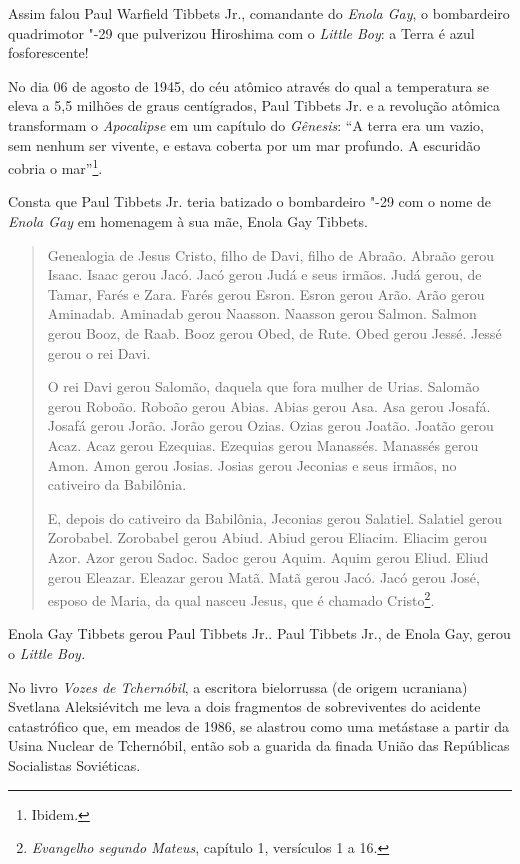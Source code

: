 Assim falou Paul Warfield Tibbets Jr., comandante do \emph{Enola Gay}, o
bombardeiro quadrimotor "-29 que pulverizou Hiroshima com o \emph{Little
Boy}: a Terra é azul fosforescente!

No dia 06 de agosto de 1945, do céu atômico através do qual a
temperatura se eleva a 5,5 milhões de graus centígrados, Paul Tibbets
Jr. e a revolução atômica transformam o \emph{Apocalipse} em um capítulo
do \emph{Gênesis}: ``A terra era um vazio, sem nenhum ser vivente, e
estava coberta por um mar profundo. A escuridão cobria o mar''\footnote{Ibidem.}.

Consta que Paul Tibbets Jr. teria batizado o bombardeiro "-29 com o nome
de \emph{Enola Gay} em homenagem à sua mãe, Enola Gay Tibbets.

\begin{quote}
Genealogia de Jesus Cristo, filho de Davi, filho de Abraão. Abraão gerou
Isaac. Isaac gerou Jacó. Jacó gerou Judá e seus irmãos. Judá gerou, de
Tamar, Farés e Zara. Farés gerou Esron. Esron gerou Arão. Arão gerou
Aminadab. Aminadab gerou Naasson. Naasson gerou Salmon. Salmon gerou
Booz, de Raab. Booz gerou Obed, de Rute. Obed gerou Jessé. Jessé gerou o
rei Davi.

O rei Davi gerou Salomão, daquela que fora mulher de Urias. Salomão
gerou Roboão. Roboão gerou Abias. Abias gerou Asa. Asa gerou Josafá.
Josafá gerou Jorão. Jorão gerou Ozias. Ozias gerou Joatão. Joatão gerou
Acaz. Acaz gerou Ezequias. Ezequias gerou Manassés. Manassés gerou Amon.
Amon gerou Josias. Josias gerou Jeconias e seus irmãos, no cativeiro da
Babilônia.

E, depois do cativeiro da Babilônia, Jeconias gerou Salatiel. Salatiel
gerou Zorobabel. Zorobabel gerou Abiud. Abiud gerou Eliacim. Eliacim
gerou Azor. Azor gerou Sadoc. Sadoc gerou Aquim. Aquim gerou Eliud.
Eliud gerou Eleazar. Eleazar gerou Matã. Matã gerou Jacó. Jacó gerou
José, esposo de Maria, da qual nasceu Jesus, que é chamado
Cristo\footnote{\emph{Evangelho segundo Mateus}, capítulo 1, versículos
  1 a 16.}.
\end{quote}

Enola Gay Tibbets gerou Paul Tibbets Jr.. Paul Tibbets Jr., de Enola
Gay, gerou o \emph{Little Boy. }

No livro \emph{Vozes de Tchernóbil}, a escritora bielorrussa (de origem
ucraniana) Svetlana Aleksiévitch me leva a dois fragmentos de
sobreviventes do acidente catastrófico que, em meados de 1986, se
alastrou como uma metástase a partir da Usina Nuclear de Tchernóbil,
então sob a guarida da finada União das Repúblicas Socialistas
Soviéticas.

